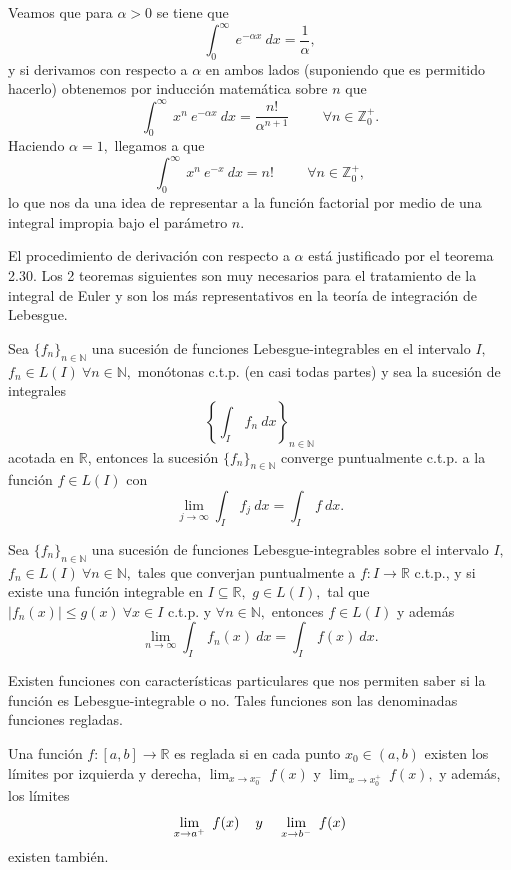 Veamos que para $\alpha > 0$ se tiene que $$\int_{0}^{\infty}\ e^{-\alpha x}\ dx = \frac{1}{\alpha},$$ y si derivamos con respecto a $\alpha$ en ambos lados (suponiendo que es permitido hacerlo) obtenemos por inducción matemática sobre $n$ que $$\int_{0}^{\infty}\ x^n\ e^{-\alpha x}\ dx = \frac{n!}{\alpha^{n+1}}\hspace{1cm}\forall n \in \mathbb{Z}_0^+.$$ Haciendo $\alpha = 1,$ llegamos a que 
\begin{equation}
	\int_{0}^{\infty}\ x^n\ e^{-x}\ dx = n!\hspace{1cm}\forall n \in \mathbb{Z}_0^+,
\end{equation}
lo que nos da una idea de representar a la función factorial por medio de una integral impropia bajo el parámetro $n$.

El procedimiento de derivación con respecto a $\alpha$ está justificado por el teorema 2.30. Los 2 teoremas siguientes son muy necesarios para el tratamiento de la integral de Euler y son los más representativos en la teoría de integración de Lebesgue.
\begin{theorem}
	Sea $\{f_n\}_{n \in \mathbb{N}}$ una sucesión de funciones Lebesgue-integrables en el intervalo $I,$ $f_n \in L(I)\ \forall n \in \mathbb{N},$ monótonas c.t.p. (en casi todas partes) y sea la sucesión de integrales $$\left\{\int_{I}\ f_n\ dx\right\}_{n \in \mathbb{N}}$$ acotada en $\mathbb{R}$, entonces la sucesión $\{f_n\}_{n \in \mathbb{N}}$ converge puntualmente c.t.p. a la función $f \in L(I)$ con $$\lim_{j \rightarrow \infty}\int_{I}\ f_j\ dx = \int_{I}\ f\ dx.$$
\end{theorem}
\begin{theorem}
	Sea $\{f_n\}_{n \in \mathbb{N}}$ una sucesión de funciones Lebesgue-integrables sobre el intervalo $I,$ $f_n \in L(I)\ \forall n \in \mathbb{N},$ tales que converjan puntualmente a $f: I \rightarrow \mathbb{R}$ c.t.p., y si existe una función integrable en $I \subseteq \mathbb{R},$ $g \in L(I),$ tal que $|f_n(x)| \leq g(x)\ \forall x \in I$ c.t.p. y $\forall n \in \mathbb{N},$ entonces $f \in L(I)$ y además $$\lim_{n \rightarrow \infty}\int_{I}\ f_n(x)\ dx = \int_{I}\ f(x)\ dx.$$
\end{theorem}
Existen funciones con características particulares que nos permiten saber si la función es Lebesgue-integrable o no. Tales funciones son las denominadas funciones regladas.
\begin{definition}
	Una función $f: [a,b] \rightarrow \mathbb{R}$ es reglada si en cada punto $x_0 \in (a,b)$ existen los límites por izquierda y derecha, $\lim_{x \rightarrow x_0^-}\ f(x)$ y $\lim_{x \rightarrow x_0^+}\ f(x),$ y además, los límites $$\lim_{x \rightarrow a^+}\ f(x)\hspace{0.4cm}y\hspace{0.4cm}\lim_{x \rightarrow b^-}\ f(x)$$ existen también. 
\end{definition}
